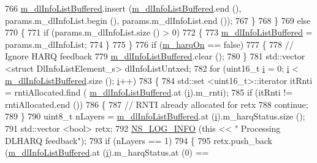 \begin{DoxyCode}
766           \hyperlink{classns3_1_1FdBetFfMacScheduler_ae987d949dcc264154314730346f4a7a8}{m\_dlInfoListBuffered}.insert (\hyperlink{classns3_1_1FdBetFfMacScheduler_ae987d949dcc264154314730346f4a7a8}{m\_dlInfoListBuffered}.end (),
       params.m\_dlInfoList.begin (), params.m\_dlInfoList.end ());
767         \}
768     \}
769   \textcolor{keywordflow}{else}
770     \{
771       \textcolor{keywordflow}{if} (params.m\_dlInfoList.size () > 0)
772         \{
773           \hyperlink{classns3_1_1FdBetFfMacScheduler_ae987d949dcc264154314730346f4a7a8}{m\_dlInfoListBuffered} = params.m\_dlInfoList;
774         \}
775     \}
776   \textcolor{keywordflow}{if} (\hyperlink{classns3_1_1FdBetFfMacScheduler_a37792b61da166e932f6697569d19a479}{m\_harqOn} == \textcolor{keyword}{false})
777     \{
778       \textcolor{comment}{// Ignore HARQ feedback}
779       \hyperlink{classns3_1_1FdBetFfMacScheduler_ae987d949dcc264154314730346f4a7a8}{m\_dlInfoListBuffered}.clear ();
780     \}
781   std::vector <struct DlInfoListElement\_s> dlInfoListUntxed;
782   \textcolor{keywordflow}{for} (uint16\_t \hyperlink{bernuolliDistribution_8m_a6f6ccfcf58b31cb6412107d9d5281426}{i} = 0; \hyperlink{bernuolliDistribution_8m_a6f6ccfcf58b31cb6412107d9d5281426}{i} < \hyperlink{classns3_1_1FdBetFfMacScheduler_ae987d949dcc264154314730346f4a7a8}{m\_dlInfoListBuffered}.size (); \hyperlink{bernuolliDistribution_8m_a6f6ccfcf58b31cb6412107d9d5281426}{i}++)
783     \{
784       std::set <uint16\_t>::iterator itRnti = rntiAllocated.find (
      \hyperlink{classns3_1_1FdBetFfMacScheduler_ae987d949dcc264154314730346f4a7a8}{m\_dlInfoListBuffered}.at (\hyperlink{bernuolliDistribution_8m_a6f6ccfcf58b31cb6412107d9d5281426}{i}).m\_rnti);
785       \textcolor{keywordflow}{if} (itRnti != rntiAllocated.end ())
786         \{
787           \textcolor{comment}{// RNTI already allocated for retx}
788           \textcolor{keywordflow}{continue};
789         \}
790       uint8\_t nLayers = \hyperlink{classns3_1_1FdBetFfMacScheduler_ae987d949dcc264154314730346f4a7a8}{m\_dlInfoListBuffered}.at (\hyperlink{bernuolliDistribution_8m_a6f6ccfcf58b31cb6412107d9d5281426}{i}).m\_harqStatus.size ();
791       std::vector <bool> retx;
792       \hyperlink{group__logging_gafbd73ee2cf9f26b319f49086d8e860fb}{NS\_LOG\_INFO} (\textcolor{keyword}{this} << \textcolor{stringliteral}{" Processing DLHARQ feedback"});
793       \textcolor{keywordflow}{if} (nLayers == 1)
794         \{
795           retx.push\_back (\hyperlink{classns3_1_1FdBetFfMacScheduler_ae987d949dcc264154314730346f4a7a8}{m\_dlInfoListBuffered}.at (\hyperlink{bernuolliDistribution_8m_a6f6ccfcf58b31cb6412107d9d5281426}{i}).m\_harqStatus.at (0) == 

\end{DoxyCode}

